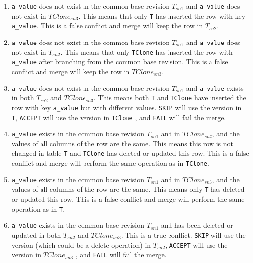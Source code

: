\documentclass[sigconf,nonacm]{acmart} %
\begin{document}
\begin{enumerate}
\item \texttt{a\_value} does not exist in the common base revision $T_{sn1}$ 
and \texttt{a\_value} does not exist in $TClone_{sn3}$.
This means that only \texttt{T} has inserted the row with key \texttt{a\_value}.
This is a false conflict and merge will keep the row in $T_{sn2}$.

\item \texttt{a\_value} does not exist in the common base revision $T_{sn1}$
and \texttt{a\_value} does not exist in $T_{sn2}$.
This means that only \texttt{TClone} has inserted the row with 
\texttt{a\_value} after branching from the common base revision.  
This is a false conflict and 
merge will keep the row in $TClone_{sn3}$.

\item \texttt{a\_value} does not exist in the common base revision 
$T_{sn1}$ and 
\texttt{a\_value} exists in both $T_{sn2}$ and $TClone_{sn3}$.
This means both \texttt{T} and \texttt{TClone} have inserted the row 
with key \texttt{a\_value} but with different values.  
\texttt{SKIP} will use the version in \texttt{T}, 
\texttt{ACCEPT} will use the version in \texttt{TClone}
, and \texttt{FAIL} will fail the merge.

\item \texttt{a\_value} exists in the common base revision $T_{sn1}$ 
and in $TClone_{sn2}$, and the values of all columns of the row 
are the same.  This means this row is not changed in table 
\texttt{T} and \texttt{TClone} has deleted or updated 
this row.  This is a false conflict and merge will perform the 
same operation as in \texttt{TClone}.

\item \texttt{a\_value} exists in the common base revision $T_{sn1}$ 
and in $TClone_{sn3}$, and the values of all columns of the row 
are the same. This means only \texttt{T} has deleted or updated 
this row.  This is a false conflict and merge will perform the 
same operation as in \texttt{T}.

\item \texttt{a\_value} exists in the common base revision $T_{sn1}$
and has been deleted or updated in both $T_{sn2}$ and $TClone_{sn3}$.  
This is a true conflict.
\texttt{SKIP} will use the version (which could be a delete operation) 
in $T_{sn2}$, \texttt{ACCEPT} will use the version in $TClone_{sn3}$
, and \texttt{FAIL} will fail the merge.
\end{enumerate}
\end{document}
